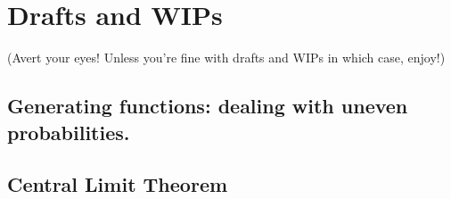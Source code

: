 \documentclass[../main/main.tex]{subfiles}
\begin{document}
\chapter{Drafts and WIPs}\label{drafts-and-wips}

(Avert your eyes! Unless you're fine with drafts and WIPs \textemdash{} in which case, enjoy!)






\section{Generating functions: dealing with uneven probabilities.}\label{sec:generating-functions} %














\section{Central Limit Theorem} %




\end{document}
